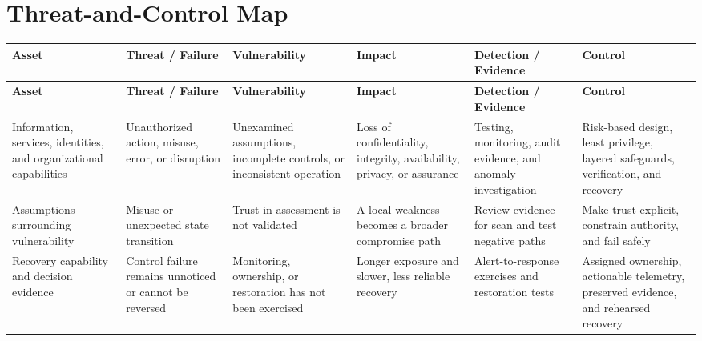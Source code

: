 \documentclass[11pt]{article}
\begin{document}
\section*{Threat-and-Control Map}
\begingroup\scriptsize\setlength{\tabcolsep}{2pt}
\begin{longtable}{>{\RaggedRight\arraybackslash}p{}>{\RaggedRight\arraybackslash}p{}>{\RaggedRight\arraybackslash}p{}>{\RaggedRight\arraybackslash}p{}>{\RaggedRight\arraybackslash}p{}>{\RaggedRight\arraybackslash}p{}}
\toprule\rowcolor{Navy}\color{white}\textbf{Asset} & \color{white}\textbf{Threat / Failure} & \color{white}\textbf{Vulnerability} & \color{white}\textbf{Impact} & \color{white}\textbf{Detection / Evidence} & \color{white}\textbf{Control}\\\midrule
\endfirsthead
\toprule\rowcolor{Navy}\color{white}\textbf{Asset} & \color{white}\textbf{Threat / Failure} & \color{white}\textbf{Vulnerability} & \color{white}\textbf{Impact} & \color{white}\textbf{Detection / Evidence} & \color{white}\textbf{Control}\\\midrule
\endhead
Information, services, identities, and organizational capabilities & Unauthorized action, misuse, error, or disruption & Unexamined assumptions, incomplete controls, or inconsistent operation & Loss of confidentiality, integrity, availability, privacy, or assurance & Testing, monitoring, audit evidence, and anomaly investigation & Risk-based design, least privilege, layered safeguards, verification, and recovery\\\midrule
Assumptions surrounding vulnerability & Misuse or unexpected state transition & Trust in assessment is not validated & A local weakness becomes a broader compromise path & Review evidence for scan and test negative paths & Make trust explicit, constrain authority, and fail safely\\\midrule
Recovery capability and decision evidence & Control failure remains unnoticed or cannot be reversed & Monitoring, ownership, or restoration has not been exercised & Longer exposure and slower, less reliable recovery & Alert-to-response exercises and restoration tests & Assigned ownership, actionable telemetry, preserved evidence, and rehearsed recovery\\\midrule
\bottomrule
\end{longtable}
\endgroup
\end{document}
